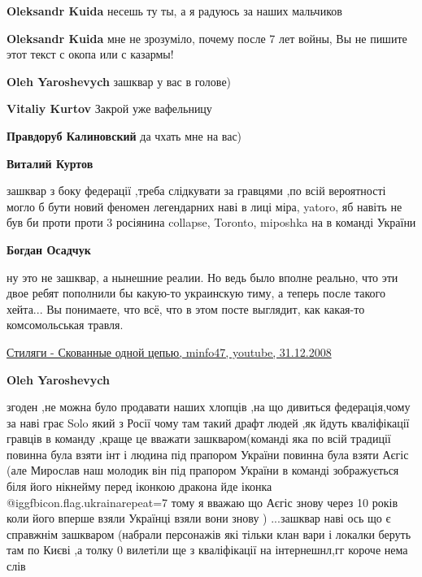 \begin{itemize}
\begin{itemize}
\begin{itemize}
\textbf{Oleksandr Kuida} несешь ту ты, а я радуюсь за наших мальчиков

\textbf{Oleksandr Kuida} мне не зрозуміло, почему после 7 лет войны, Вы не пишите этот текст с окопа или с казармы!
\end{itemize} %

\textbf{Oleh Yaroshevych} зашквар у вас в голове)

\begin{itemize} %
\textbf{Vitaliy Kurtov} Закрой уже вафельницу

\textbf{Правдоруб Калиновский} да чхать мне на вас)

\textbf{Виталий Куртов} 

зашквар з боку федерації ,треба слідкувати за гравцями ,по всій вероятності
могло б бути новий феномен легендарних наві в лиці міра, yatoro, яб навіть не
був би проти проти 3 росіянина collapse, Toronto, miposhka на в команді України


\textbf{Богдан Осадчук} 

ну это не зашквар, а нынешние реалии. Но ведь было вполне реально, что эти двое
ребят пополнили бы какую-то украинскую тиму, а теперь после такого хейта... Вы
понимаете, что всё, что в этом посте выглядит, как какая-то комсомольськая
травля. 

\href{https://youtu.be/sD7JcIsfjGw}{%
Стиляги - Скованные одной цепью, minfo47, youtube, 31.12.2008%
}

\end{itemize} %

\textbf{Oleh Yaroshevych} 

згоден ,не можна було продавати наших хлопців ,на що дивиться федерація,чому за
наві грає Solo який з Росії чому там такий драфт людей ,як йдуть кваліфікації
гравців в команду ,краще це вважати зашкваром(команді яка по всій традиції
повинна була взяти інт і людина під прапором України повинна була взяти Аєгіс
(але Мирослав наш молодик він під прапором України в команді зображується біля
його нікнейму перед іконкою дракона йде іконка @igg{fbicon.flag.ukraina}{repeat=7}
тому я вважаю що Аєгіс знову через 10 років коли його вперше взяли Українці
взяли вони знову ) ...зашквар наві ось що є справжнім зашкваром (набрали
персонажів які тільки клан вари і локалки беруть там по Києві ,а толку 0
вилетіли ще з кваліфікації на інтернешнл,гг короче нема слів


\end{itemize}
\end{itemize}
